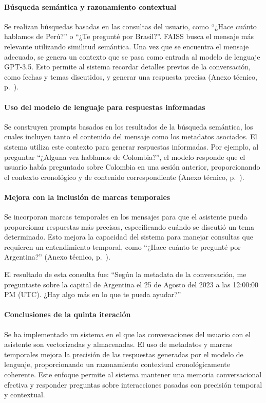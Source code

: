 \paragraph{Búsqueda semántica y razonamiento contextual}

Se realizan búsquedas basadas en las consultas del usuario, como ``¿Hace cuánto hablamos de Perú?'' o ``¿Te pregunté por Brasil?''. FAISS busca el mensaje más relevante utilizando similitud semántica. Una vez que se encuentra el mensaje adecuado, se genera un contexto que se pasa como entrada al modelo de lenguaje GPT-3.5. Esto permite al sistema recordar detalles previos de la conversación, como fechas y temas discutidos, y generar una respuesta precisa (Anexo técnico, p.~\pageref{anexo:code-4-1-5-4}).

\paragraph{Uso del modelo de lenguaje para respuestas informadas}

Se construyen prompts basados en los resultados de la búsqueda semántica, los cuales incluyen tanto el contenido del mensaje como los metadatos asociados. El sistema utiliza este contexto para generar respuestas informadas. Por ejemplo, al preguntar ``¿Alguna vez hablamos de Colombia?'', el modelo responde que el usuario había preguntado sobre Colombia en una sesión anterior, proporcionando el contexto cronológico y de contenido correspondiente (Anexo técnico, p.~\pageref{anexo:code-4-1-5-5}).

\paragraph{Mejora con la inclusión de marcas temporales}

Se incorporan marcas temporales en los mensajes para que el asistente pueda proporcionar respuestas más precisas, especificando cuándo se discutió un tema determinado. Esto mejora la capacidad del sistema para manejar consultas que requieren un entendimiento temporal, como ``¿Hace cuánto te pregunté por Argentina?'' (Anexo técnico, p.~\pageref{anexo:code-4-1-5-6}).

El resultado de esta consulta fue: ``Según la metadata de la conversación, me preguntaste sobre la capital de Argentina el 25 de Agosto del 2023 a las 12:00:00 PM (UTC). ¿Hay algo más en lo que te pueda ayudar?''

\paragraph{Conclusiones de la quinta iteración}

Se ha implementado un sistema en el que las conversaciones del usuario con el asistente son vectorizadas y almacenadas. El uso de metadatos y marcas temporales mejora la precisión de las respuestas generadas por el modelo de lenguaje, proporcionando un razonamiento contextual cronológicamente coherente. Este enfoque permite al sistema mantener una memoria conversacional efectiva y responder preguntas sobre interacciones pasadas con precisión temporal y contextual. 